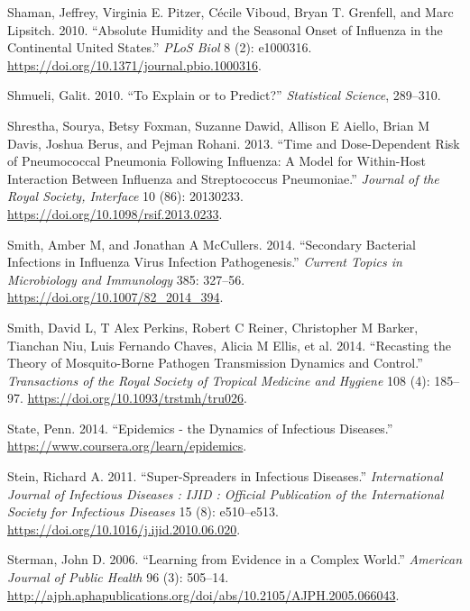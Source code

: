 \documentclass[
]{book}
\begin{document}
\leavevmode\hypertarget{ref-shaman10}{}%
Shaman, Jeffrey, Virginia E. Pitzer, Cécile Viboud, Bryan T. Grenfell, and Marc Lipsitch. 2010. ``Absolute Humidity and the Seasonal Onset of Influenza in the Continental United States.'' \emph{PLoS Biol} 8 (2): e1000316. \url{https://doi.org/10.1371/journal.pbio.1000316}.

\leavevmode\hypertarget{ref-shmueli10}{}%
Shmueli, Galit. 2010. ``To Explain or to Predict?'' \emph{Statistical Science}, 289--310.

\leavevmode\hypertarget{ref-shrestha13}{}%
Shrestha, Sourya, Betsy Foxman, Suzanne Dawid, Allison E Aiello, Brian M Davis, Joshua Berus, and Pejman Rohani. 2013. ``Time and Dose-Dependent Risk of Pneumococcal Pneumonia Following Influenza: A Model for Within-Host Interaction Between Influenza and Streptococcus Pneumoniae.'' \emph{Journal of the Royal Society, Interface} 10 (86): 20130233. \url{https://doi.org/10.1098/rsif.2013.0233}.

\leavevmode\hypertarget{ref-smith14a}{}%
Smith, Amber M, and Jonathan A McCullers. 2014. ``Secondary Bacterial Infections in Influenza Virus Infection Pathogenesis.'' \emph{Current Topics in Microbiology and Immunology} 385: 327--56. \url{https://doi.org/10.1007/82_2014_394}.

\leavevmode\hypertarget{ref-smith14}{}%
Smith, David L, T Alex Perkins, Robert C Reiner, Christopher M Barker, Tianchan Niu, Luis Fernando Chaves, Alicia M Ellis, et al. 2014. ``Recasting the Theory of Mosquito-Borne Pathogen Transmission Dynamics and Control.'' \emph{Transactions of the Royal Society of Tropical Medicine and Hygiene} 108 (4): 185--97. \url{https://doi.org/10.1093/trstmh/tru026}.

\leavevmode\hypertarget{ref-epimooc}{}%
State, Penn. 2014. ``Epidemics - the Dynamics of Infectious Diseases.'' \url{https://www.coursera.org/learn/epidemics}.

\leavevmode\hypertarget{ref-stein11}{}%
Stein, Richard A. 2011. ``Super-Spreaders in Infectious Diseases.'' \emph{International Journal of Infectious Diseases : IJID : Official Publication of the International Society for Infectious Diseases} 15 (8): e510--e513. \url{https://doi.org/10.1016/j.ijid.2010.06.020}.

\leavevmode\hypertarget{ref-sterman06}{}%
Sterman, John D. 2006. ``Learning from Evidence in a Complex World.'' \emph{American Journal of Public Health} 96 (3): 505--14. \url{http://ajph.aphapublications.org/doi/abs/10.2105/AJPH.2005.066043}.
\end{document}
